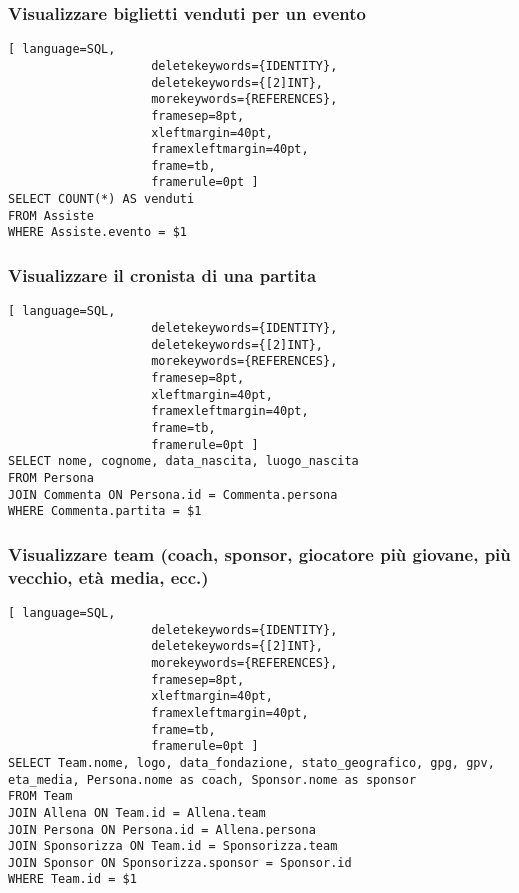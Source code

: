 \documentclass{article}
\begin{document}
\subsubsection{Visualizzare biglietti venduti per un evento}
\begin{lstlisting}[ language=SQL,
                    deletekeywords={IDENTITY},
                    deletekeywords={[2]INT},
                    morekeywords={REFERENCES},
                    framesep=8pt,
                    xleftmargin=40pt,
                    framexleftmargin=40pt,
                    frame=tb,
                    framerule=0pt ]
SELECT COUNT(*) AS venduti
FROM Assiste
WHERE Assiste.evento = $1
\end{lstlisting}

\subsubsection{Visualizzare il cronista di una partita}
\begin{lstlisting}[ language=SQL,
                    deletekeywords={IDENTITY},
                    deletekeywords={[2]INT},
                    morekeywords={REFERENCES},
                    framesep=8pt,
                    xleftmargin=40pt,
                    framexleftmargin=40pt,
                    frame=tb,
                    framerule=0pt ]
SELECT nome, cognome, data_nascita, luogo_nascita
FROM Persona
JOIN Commenta ON Persona.id = Commenta.persona
WHERE Commenta.partita = $1
\end{lstlisting}

\subsubsection{Visualizzare team (coach, sponsor, giocatore più giovane, più vecchio, età media, ecc.)}
\begin{lstlisting}[ language=SQL,
                    deletekeywords={IDENTITY},
                    deletekeywords={[2]INT},
                    morekeywords={REFERENCES},
                    framesep=8pt,
                    xleftmargin=40pt,
                    framexleftmargin=40pt,
                    frame=tb,
                    framerule=0pt ]
SELECT Team.nome, logo, data_fondazione, stato_geografico, gpg, gpv, eta_media, Persona.nome as coach, Sponsor.nome as sponsor
FROM Team
JOIN Allena ON Team.id = Allena.team
JOIN Persona ON Persona.id = Allena.persona
JOIN Sponsorizza ON Team.id = Sponsorizza.team
JOIN Sponsor ON Sponsorizza.sponsor = Sponsor.id
WHERE Team.id = $1
\end{lstlisting}
\end{document}
